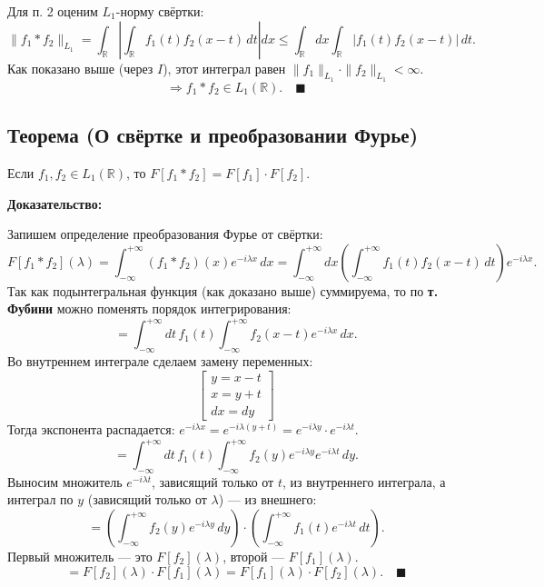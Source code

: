 \documentclass[12pt,a4paper,openany]{book}
\begin{document}
Для п. 2 оценим $L_1$-норму свёртки:
$$
\|f_1 * f_2\|_{L_1} = \int_{\mathbb{R}} \left| \int_{\mathbb{R}} f_1(t) f_2(x-t) \, dt \right| dx \le \int_{\mathbb{R}} dx \int_{\mathbb{R}} |f_1(t) f_2(x-t)| \, dt.
$$
Как показано выше (через $I$), этот интеграл равен $\|f_1\|_{L_1} \cdot \|f_2\|_{L_1} < \infty$.
$$
\Rightarrow f_1 * f_2 \in L_1(\mathbb{R}). \quad \blacksquare
$$




\subsection{Теорема (О свёртке и преобразовании Фурье)}

Если $f_1, f_2 \in L_1(\mathbb{R})$, то $F[f_1 * f_2] = F[f_1] \cdot F[f_2]$.

\textbf{Доказательство:}

Запишем определение преобразования Фурье от свёртки:
$$
F[f_1 * f_2](\lambda) = \int_{-\infty}^{+\infty} (f_1 * f_2)(x) e^{-i\lambda x} \, dx = \int_{-\infty}^{+\infty} dx \left( \int_{-\infty}^{+\infty} f_1(t) f_2(x-t) \, dt \right) e^{-i\lambda x}.
$$
Так как подынтегральная функция (как доказано выше) суммируема, то по \textbf{т. Фубини} можно поменять порядок интегрирования:
$$
= \int_{-\infty}^{+\infty} dt \, f_1(t) \int_{-\infty}^{+\infty} f_2(x-t) e^{-i\lambda x} \, dx.
$$
Во внутреннем интеграле сделаем замену переменных:
$$
\left[ \begin{gathered} y = x - t \\ x = y + t \\ dx = dy \end{gathered} \right]
$$
Тогда экспонента распадается: $e^{-i\lambda x} = e^{-i\lambda(y+t)} = e^{-i\lambda y} \cdot e^{-i\lambda t}$.
$$
= \int_{-\infty}^{+\infty} dt \, f_1(t) \int_{-\infty}^{+\infty} f_2(y) e^{-i\lambda y} e^{-i\lambda t} \, dy.
$$
Выносим множитель $e^{-i\lambda t}$, зависящий только от $t$, из внутреннего интеграла, а интеграл по $y$ (зависящий только от $\lambda$) — из внешнего:
$$
= \left( \int_{-\infty}^{+\infty} f_2(y) e^{-i\lambda y} \, dy \right) \cdot \left( \int_{-\infty}^{+\infty} f_1(t) e^{-i\lambda t} \, dt \right).
$$
Первый множитель — это $F[f_2](\lambda)$, второй — $F[f_1](\lambda)$.
$$
= F[f_2](\lambda) \cdot F[f_1](\lambda) = F[f_1](\lambda) \cdot F[f_2](\lambda). \quad \blacksquare
$$
\end{document}
